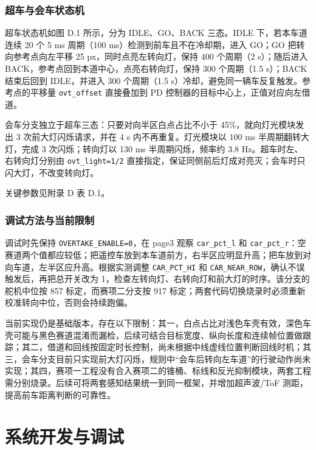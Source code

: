 \documentclass{MaiTechReport}
\begin{document}
\subsubsection{超车与会车状态机}
超车状态机如图 D.1 所示，分为 IDLE、GO、BACK 三态。IDLE 下，若本车道连续 20 个 5 ms 周期（100 ms）检测到前车且不在冷却期，进入 GO；GO 把转向参考点向左平移 25 px，同时点亮左转向灯，保持 400 个周期（2 s）；随后进入 BACK，参考点回到本道中心，点亮右转向灯，保持 300 个周期（1.5 s）；BACK 结束后回到 IDLE，并进入 300 个周期（1.5 s）冷却，避免同一辆车反复触发。参考点的平移量 \texttt{ovt\_offset} 直接叠加到 PD 控制器的目标中心上，正值对应向左借道。



会车分支独立于超车三态：只要对向半区白点占比不小于 45\%，就向灯光模块发出 3 次前大灯闪烁请求，并在 4 s 内不再重复。灯光模块以 100 ms 半周期翻转大灯，完成 3 次闪烁；转向灯以 130 ms 半周期闪烁，频率约 3.8 Hz。超车时左、右转向灯分别由 \texttt{ovt\_light=1/2} 直接指定，保证同侧前后灯成对亮灭；会车时只闪大灯，不改变转向灯。

关键参数见附录 D 表 D.1。



\subsubsection{调试方法与当前限制}
调试时先保持 \texttt{OVERTAKE\_ENABLE=0}，在 page3 观察 \texttt{car\_pct\_l} 和 \texttt{car\_pct\_r}：空赛道两个值都应较低；把遥控车放到本车道前方，右半区应明显升高；把车放到对向车道，左半区应升高。根据实测调整 \texttt{CAR\_PCT\_HI} 和 \texttt{CAR\_NEAR\_ROW}，确认不误触发后，再把总开关改为 1，检查左转向灯、右转向灯和前大灯的时序。该分支的舵机中位按 857 标定，而赛项二分支按 917 标定；两套代码切换烧录时必须重新校准转向中位，否则会持续跑偏。

当前实现仍是基础版本，存在以下限制：其一，白点占比对浅色车壳有效，深色车壳可能与黑色赛道混淆而漏检，后续可结合目标宽度、纵向长度和连续帧位置做跟踪；其二，借道和回线按固定时长控制，尚未根据中线虚线位置判断回线时机；其三，会车分支目前只实现前大灯闪烁，规则中“会车后转向左车道”的行驶动作尚未实现；其四，赛项一工程没有合入赛项二的锥桶、标线和反光抑制模块，两套工程需分别烧录。后续可将两套感知结果统一到同一框架，并增加超声波/ToF 测距，提高前车距离判断的可靠性。

\section{系统开发与调试}
\label{sec:debug}
\end{document}
